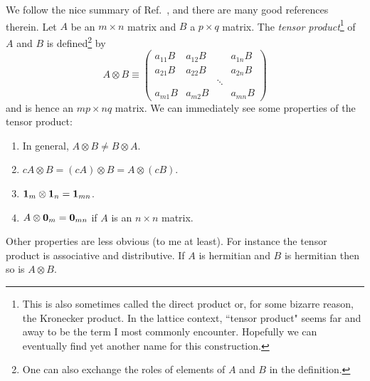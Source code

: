 We follow the nice summary of Ref.~\cite{matrixCalc}, and there
are many good references therein.
Let $A$ be an $m\times n$ matrix and $B$ a $p\times q$ matrix. 
The {\it tensor product}\footnote{This is also sometimes called
the direct product 
or, for some bizarre reason,
the Kronecker product. 
In the lattice context, ``tensor product" seems far and away to be
the term I most commonly encounter.
Hopefully we can eventually
find yet another name for this construction.} 
of $A$ and $B$ is defined\footnote{One can also exchange the roles
of elements of $A$ and $B$ in the definition.} by
\begin{equation}
A \otimes B\equiv\left(\begin{array}{cccc}
a_{11} B & a_{12} B &  & a_{1 n} B \\
a_{21} B & a_{22} B &  & a_{2 n} B \\
 &  & \ddots &  \\
a_{m 1} B & a_{m 2} B &  & a_{m n} B
\end{array}\right)
\end{equation}
and is hence an $mp\times nq$ matrix.
We can immediately see some properties of the tensor product:
\begin{enumerate}
\item In general, $A\otimes B\neq B\otimes A$. 
\item $cA\otimes B=(cA)\otimes B=A\otimes(cB)$.
\item ${\mathbf 1}_m\otimes{\mathbf 1}_n={\mathbf 1}_{mn}$.
\item $A\otimes {\mathbf 0}_m={\mathbf 0}_{mn}$ if $A$ is an $n\times n$ matrix.
\end{enumerate}
Other properties are less obvious (to me at least). For instance
the tensor product is associative and distributive.
If $A$ is hermitian and $B$ is hermitian then so is $A\otimes B$.

